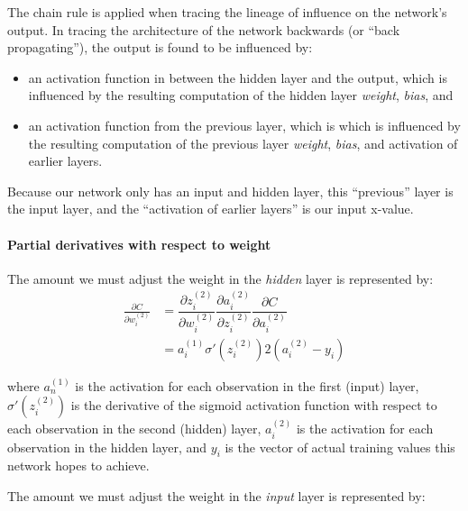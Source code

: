 The chain rule is applied when tracing the lineage of influence on the
network's output. In tracing the architecture of the network backwards
(or ``back propagating''), the output is found to be influenced by:

\begin{itemize}
\tightlist
\item
  an activation function in between the hidden layer and the output,
  which is influenced by the resulting computation of the hidden layer
  \emph{weight}, \emph{bias}, and
\item
  an activation function from the previous layer, which is which is
  influenced by the resulting computation of the previous layer
  \emph{weight}, \emph{bias}, and activation of earlier layers.
\end{itemize}

Because our network only has an input and hidden layer, this
``previous'' layer is the input layer, and the ``activation of earlier
layers'' is our input x-value.


\hypertarget{partial-derivatives-with-respect-to-weight}{%
\paragraph{Partial derivatives with respect to
weight}\label{partial-derivatives-with-respect-to-weight}}

The amount we must adjust the weight in the \emph{hidden} layer is
represented by:
\begin{align*}
\frac{\partial{C}}{\partial{w_i^{(2)}}}    &=  \dfrac{\partial{z_i^{(2)}}}{\partial{w_i^{(2)}}}
     \dfrac{\partial{a_i^{(2)}}}{\partial{z_i^{(2)}}}
     \dfrac{\partial{C}}{\partial{a_i^{(2)}}} \\ 
 &= a_i^{(1)} \sigma'(z_i^{(2)}) 2(a_i^{(2)}-y_i) \end{align*}

where \(a_n^{(1)}\) is the activation for each observation in the first
(input) layer, \(\sigma'(z_i^{(2)})\) is the derivative of the sigmoid
activation function with respect to each observation in the second
(hidden) layer, \(a_i^{(2)}\) is the activation for each observation in
the hidden layer, and \(y_i\) is the vector of actual training values
this network hopes to achieve.

The amount we must adjust the weight in the \emph{input} layer is
represented by:

